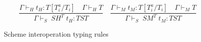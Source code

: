 \begin{figure}
\[
\frac{\Gamma\vdash_{H}t_{H}:T[T^{a}_{i}/T_{i}]\quad\Gamma\vdash_{H}T}{\Gamma\vdash_{S}\;SH^{T}\;t_{H}:TST}
\quad
\frac{\Gamma\vdash_{M}t_{M}:T[T^{a}_{i}/T_{i}]\quad\Gamma\vdash_{M}T}{\Gamma\vdash_{S}\;SM^{T}\;t_{M}:TST}
\]
\caption{Scheme interoperation typing rules}
\label{sitr}
\end{figure}
